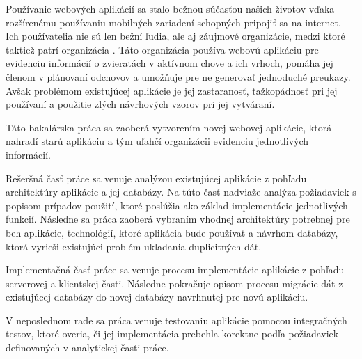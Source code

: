 \begin{introduction}

Používanie webových aplikácií sa stalo bežnou súčasťou našich životov vďaka rozšírenému používaniu mobilných zariadení schopných pripojiť sa na internet. Ich používatelia nie sú len bežní ľudia, ale aj záujmové organizácie, medzi ktoré taktiež patrí organizácia . Táto organizácia používa webovú aplikáciu pre evidenciu informácií o zvieratách v aktívnom chove a ich vrhoch, pomáha jej členom v plánovaní odchovov a umožňuje pre ne generovať jednoduché preukazy. Avšak problémom existujúcej aplikácie je jej zastaranosť, ťažkopádnosť pri jej používaní a použitie zlých návrhových vzorov pri jej vytváraní.

Táto bakalárska práca sa zaoberá vytvorením novej webovej aplikácie, ktorá nahradí starú aplikáciu a tým uľahčí organizácii evidenciu jednotlivých informácií.

Rešeršná časť práce sa venuje analýzou existujúcej aplikácie z pohľadu architektúry aplikácie a jej databázy. Na túto časť nadviaže analýza požiadaviek s popisom prípadov použití, ktoré poslúžia ako základ implementácie jednotlivých funkcií.
Následne sa práca zaoberá vybraním vhodnej architektúry potrebnej pre beh aplikácie, technológií, ktoré aplikácia bude používať a návrhom databázy, ktorá vyrieši existujúci problém ukladania duplicitných dát.

Implementačná časť práce sa venuje procesu implementácie aplikácie z pohľadu serverovej a klientskej časti. Následne pokračuje opisom procesu migrácie dát z existujúcej databázy do novej databázy navrhnutej pre novú aplikáciu.

\pagebreak

V neposlednom rade sa práca venuje testovaniu aplikácie pomocou integračných testov, ktoré overia, či jej implementácia prebehla korektne podľa požiadaviek definovaných v analytickej časti práce.

\end{introduction}